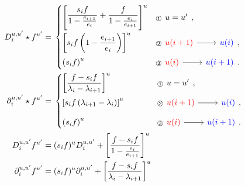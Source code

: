 \documentclass[reqno,11pt]{book}
\numberwithin{equation}{section}
\theoremstyle{plain}
\theoremstyle{plain}
\numberwithin{equation}{section}
\theoremstyle{remark}
\begin{document}
\begin{align*}
  D_i^{u,u'} \star f^{u'}=\;&\begin{cases}
  \left[ \raisebox{1mm}{$\displaystyle\frac{s_i f}{ 1-\frac{e_{i+1}}{e_{i}}}     + \frac{f}{1-\frac{e_{i}}{e_{i+1}}}$}   \right]^{u} & \text{\small\raisebox{-0.5mm}{\ding{192}}}\begin{tikzcd}[ampersand replacement=\&]
    	u=u'
     \end{tikzcd},\\[4mm]
  \left[s_i f  \left(\displaystyle 1-\frac{e_{i+1}}{e_{i}}\right) \right]^{u} & \text{\small\raisebox{-0.5mm}{\ding{193}}}\begin{tikzcd}[ampersand replacement=\&]
  	\textcolor{red}{u(i+1)} \& \textcolor{blue}{u(i)} 
  	\arrow[from=1-1, to=1-2]
   \end{tikzcd},\\[3mm]
  \left(s_i f \right)^{u} & \text{\small\raisebox{-0.5mm}{\ding{194}}}\begin{tikzcd}[ampersand replacement=\&]
    	\textcolor{red}{u(i)} \& \textcolor{blue}{u(i+1)} 
    	\arrow[from=1-1, to=1-2]
     \end{tikzcd}.\\
  \end{cases}\\ 
  \partial_i^{u,u'} \star f^{u'}=\;&\begin{cases}
  \left[\displaystyle\frac{f - s_i f}{ \lambda_i-\lambda_{i+1}}  \right]^{u} \hspace{16mm}$\,$& \text{\small\raisebox{-0.5mm}{\ding{192}}}\begin{tikzcd}[ampersand replacement=\&]
      	u=u'
       \end{tikzcd},\\[3mm]
  \left[s_i f  \left(\lambda_{i+1}-\lambda_i\right) \right]^{u} & \text{\small\raisebox{-0.5mm}{\ding{193}}}\begin{tikzcd}[ampersand replacement=\&]
  	\textcolor{red}{u(i+1)} \& \textcolor{blue}{u(i)} 
  	\arrow[from=1-1, to=1-2]
   \end{tikzcd},\\[3mm]
  \left(s_i f \right)^{u} &\text{\small\raisebox{-0.5mm}{\ding{194}}} \begin{tikzcd}[ampersand replacement=\&]
    	\textcolor{red}{u(i)} \& \textcolor{blue}{u(i+1)} 
    	\arrow[from=1-1, to=1-2]
     \end{tikzcd}.\\
  \end{cases}\\ 
  D_i^{u,u'} f^{u'} =\;& (s_i f)^{u} D_i^{u,u'} + \left[\frac{f- s_i f}{1- \frac{e_{i}}{e_{i+1}}}\right]^{u}\\ 
  \partial_i^{u,u'} f^{u'} =\;& (s_i f)^{u} \partial_i^{u,u'} + \left[\frac{f- s_i f}{\lambda_{i}-\lambda_{i+1}}\right]^{u}\\   
\end{align*}
\endgroup
\end{document}
